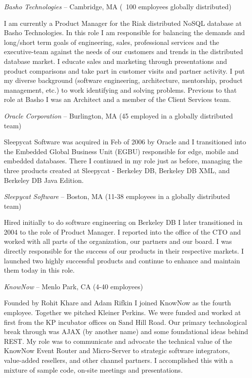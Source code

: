 \documentclass[letterpaper]{article}
\renewenvironment{itemize}{
  \begin{list}{}{
    \setlength{\leftmargin}{1.5em}
  }
}{
  \end{list}
}
\begin{document}
\begin{itemize}
\item {\it Basho Technologies} -- Cambridge, MA (~100 employees globally distributed)

I am currently a Product Manager for the Riak distributed NoSQL database at
Basho Technologies. In this role I am responsible for balancing the demands and
long/short term goals of engineering, sales, professional services and the
executive-team against the needs of our customers and trends in the distributed
database market. I educate sales and marketing through presentations and
product comparisons and take part in customer visits and partner activity. I
put my diverse background (software engineering, architecture, mentorship,
product management, etc.) to work identifying and solving problems. Previous to
that role at Basho I was an Architect and a member of the Client Services team.

\begin{itemize}
\item {\it Oracle Corporation} -- Burlington, MA (45 employed in a globally distributed team)

Sleepycat Software was acquired in Feb of 2006 by Oracle and I transitioned
into the Embedded Global Business Unit (EGBU) responsible for edge, mobile and
embedded databases. There I continued in my role just as before, managing the
three products created at Sleepycat - Berkeley DB, Berkeley DB XML, and
Berkeley DB Java Edition.

\item {\it Sleepycat Software} -- Boston, MA (11-38 employees in a globally distributed team)

Hired initially to do software engineering on Berkeley DB I later transitioned
in 2004 to the role of Product Manager. I reported into the office of the CTO
and worked with all parts of the organization, our partners and our board. I
was directly responsible for the success of our products in their respective
markets. I launched two highly successful products and continue to enhance and
maintain them today in this role.

\item {\it KnowNow} -- Menlo Park, CA (4-40 employees)

Founded by Rohit Khare and Adam Rifkin I joined KnowNow as the fourth
employee. Together we pitched Kleiner Perkins. We were funded and worked at
first from the KP incubator offices on Sand Hill Road. Our primary
technological break through was AJAX (by another name) and some foundational
ideas behind REST. My role was to communicate and advocate the technical value
of the KnowNow Event Router and Micro-Server to strategic software integrators,
value-added resellers, and other channel partners. I accomplished this with a
mixture of sample code, on-site meetings and presentations.


\end{itemize}
\end{itemize}
\end{document}
